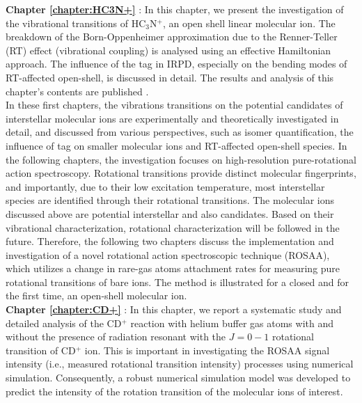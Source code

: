 \textbf{Chapter \ref{chapter:HC3N+}} \emph{}: 
In this chapter, we present the investigation of the vibrational transitions of HC$_3$N$^+$, an open shell linear 
molecular ion. The breakdown of the Born-Oppenheimer approximation due to the Renner-Teller (RT) effect (vibrational 
coupling) is analysed using an effective Hamiltonian approach. The influence of the tag in IRPD, especially on the 
bending modes of RT-affected open-shell, is discussed in detail. The results and analysis of this chapter's contents 
are published \cite{steenbakkers_vibrational_2023}.\\

In these first chapters, the vibrations transitions on the potential candidates of interstellar molecular ions are 
experimentally and theoretically investigated in detail, and discussed from various perspectives, such as isomer 
quantification, the influence of tag on smaller molecular ions and RT-affected open-shell species. In the following 
chapters, the investigation focuses on high-resolution pure-rotational action spectroscopy. Rotational transitions 
provide distinct molecular fingerprints, and importantly, due to their low excitation temperature, most interstellar 
species are identified through their rotational transitions. The molecular ions discussed above are potential 
interstellar and also  candidates. Based on their vibrational characterization, rotational 
characterization will be followed in the future. Therefore, the following two chapters discuss the implementation and 
investigation of a novel rotational action spectroscopic technique (ROSAA), which utilizes a change in rare-gas atoms 
attachment rates for measuring pure rotational transitions of bare ions. The method is illustrated for a closed and for 
the first time, an open-shell molecular ion. \\

\textbf{Chapter \ref{chapter:CD+}} \emph{}: In this chapter, we report a systematic study and detailed analysis of the CD$^+$ reaction with helium buffer gas atoms with and without the presence of radiation resonant with the $J=0-1$ rotational transition of CD$^+$ ion. This is important in investigating the ROSAA signal intensity (i.e., measured rotational transition intensity) processes using numerical simulation. Consequently, a robust numerical simulation model was developed to predict the intensity of the rotation transition of the molecular ions of interest.\\


